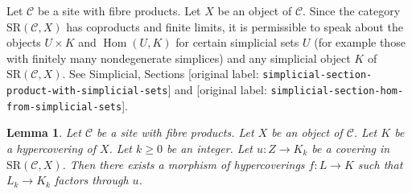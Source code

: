 \documentclass[10pt,a4paper]{article}
\theoremstyle{plain}
\newtheorem{lemma}[subsection]{Lemma}
\theoremstyle{definition}
\theoremstyle{remark}
\numberwithin{equation}{subsection}
\def\Hom{\mathop{\mathrm{Hom}}\nolimits}
\begin{document}
\noindent
Let $\mathcal{C}$ be a site with fibre products.
Let $X$ be an object of $\mathcal{C}$.
Since the category $\text{SR}(\mathcal{C}, X)$ has coproducts and
finite limits, it is permissible to speak about the objects
$U \times K$ and $\Hom(U, K)$ for certain simplicial sets $U$
(for example those with finitely many nondegenerate simplices)
and any simplicial object $K$ of $\text{SR}(\mathcal{C}, X)$.
See Simplicial, Sections
\textnormal{[original label: \nolinkurl{simplicial-section-product-with-simplicial-sets}]} and
\textnormal{[original label: \nolinkurl{simplicial-section-hom-from-simplicial-sets}]}.

\begin{lemma}
\label{lemma-covering}
Let $\mathcal{C}$ be a site with fibre products.
Let $X$ be an object of $\mathcal{C}$.
Let $K$ be a hypercovering of $X$.
Let $k \geq 0$ be an integer.
Let $u : Z \to K_k$ be a covering
in $\text{SR}(\mathcal{C}, X)$.
Then there exists a morphism of hypercoverings
$f: L \to K$ such that $L_k \to K_k$
factors through $u$.
\end{lemma}
\end{document}
